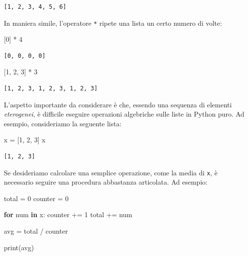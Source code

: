\documentclass[
  letterpaper,
  krantz2]{{[}./krantz{]}}
\newenvironment{Shaded}{\begin{snugshade}}{\end{snugshade}}
\newcommand{\BuiltInTok}[1]{\textcolor[rgb]{0.00,0.23,0.31}{#1}}
\newcommand{\ControlFlowTok}[1]{\textcolor[rgb]{0.00,0.23,0.31}{\textbf{#1}}}
\newcommand{\DecValTok}[1]{\textcolor[rgb]{0.68,0.00,0.00}{#1}}
\newcommand{\KeywordTok}[1]{\textcolor[rgb]{0.00,0.23,0.31}{\textbf{#1}}}
\newcommand{\NormalTok}[1]{\textcolor[rgb]{0.00,0.23,0.31}{#1}}
\newcommand{\OperatorTok}[1]{\textcolor[rgb]{0.37,0.37,0.37}{#1}}
\begin{document}
\begin{verbatim}
[1, 2, 3, 4, 5, 6]
\end{verbatim}

In maniera simile, l'operatore \texttt{*} ripete una lista un certo
numero di volte:

\begin{Shaded}
\begin{Highlighting}[]
\NormalTok{[}\DecValTok{0}\NormalTok{] }\OperatorTok{*} \DecValTok{4}
\end{Highlighting}
\end{Shaded}

\begin{verbatim}
[0, 0, 0, 0]
\end{verbatim}

\begin{Shaded}
\begin{Highlighting}[]
\NormalTok{[}\DecValTok{1}\NormalTok{, }\DecValTok{2}\NormalTok{, }\DecValTok{3}\NormalTok{] }\OperatorTok{*} \DecValTok{3}
\end{Highlighting}
\end{Shaded}

\begin{verbatim}
[1, 2, 3, 1, 2, 3, 1, 2, 3]
\end{verbatim}

L'aspetto importante da considerare è che, essendo una sequenza di
elementi \emph{eterogenei}, è difficile eseguire operazioni algebriche
sulle liste in Python puro. Ad esempio, consideriamo la seguente lista:

\begin{Shaded}
\begin{Highlighting}[]
\NormalTok{x }\OperatorTok{=}\NormalTok{ [}\DecValTok{1}\NormalTok{, }\DecValTok{2}\NormalTok{, }\DecValTok{3}\NormalTok{]}
\NormalTok{x}
\end{Highlighting}
\end{Shaded}

\begin{verbatim}
[1, 2, 3]
\end{verbatim}

Se desideriamo calcolare una semplice operazione, come la media di
\texttt{x}, è necessario seguire una procedura abbastanza articolata. Ad
esempio:

\begin{Shaded}
\begin{Highlighting}[]
\NormalTok{total }\OperatorTok{=} \DecValTok{0}
\NormalTok{counter }\OperatorTok{=} \DecValTok{0}

\ControlFlowTok{for}\NormalTok{ num }\KeywordTok{in}\NormalTok{ x:}
\NormalTok{    counter }\OperatorTok{+=} \DecValTok{1}
\NormalTok{    total }\OperatorTok{+=}\NormalTok{ num}

\NormalTok{avg }\OperatorTok{=}\NormalTok{ total }\OperatorTok{/}\NormalTok{ counter}

\BuiltInTok{print}\NormalTok{(avg)}
\end{Highlighting}
\end{Shaded}
\end{document}

